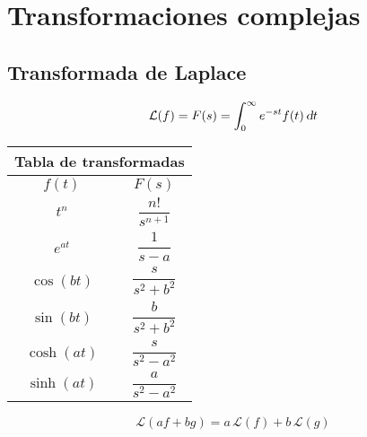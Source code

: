 \chapter{Transformaciones complejas}

\section{Transformada de Laplace}

\begin{mdframed}[style=DefinitionFrame]
    \begin{defn}
    \end{defn}
    \begin{equation*}
        \mathcal{L}(f) = F(s) = \int_0^\infty e^{-st} f(t) \, \textsl{d} t
    \end{equation*}
\end{mdframed}

\begin{center}
    \renewcommand{\arraystretch}{2.5}
    \begin{tabular}{|c|c|}
        \hline
        \multicolumn{2}{|c|}{Tabla de transformadas}
        \\ \hline \hline
        $f(t)$ & $F(s)$
        \\ \hline \hline
        $t^n$ & $\dfrac{n!}{s^{n+1}}$
        \\ \hline
        $e^{at}$ & $\dfrac{1}{s-a} $
        \\ \hline
        $\cos(bt)$ & $\dfrac{s}{s^2+b^2}$
        \\ \hline
        $\sin(bt)$ & $\dfrac{b}{s^2+b^2}$
        \\ \hline
        $\cosh(at)$ & $\dfrac{s}{s^2-a^2}$
        \\ \hline
        $\sinh(at)$ & $\dfrac{a}{s^2-a^2}$
        \\ \hline
    \end{tabular}
\end{center}

\begin{mdframed}[style=PropertyFrame]
    \begin{prop}
    \end{prop}
    \begin{equation*}
        \mathcal{L}(af + bg) = a \, \mathcal{L}(f) + b \, \mathcal{L}(g)
    \end{equation*}
\end{mdframed}

